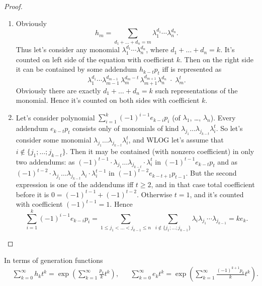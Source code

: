 \documentclass[12pt,a4paper]{article}
\begin{document}
    \begin{proof}
        \begin{enumerate}
            \item Obviously
                \[h_m = \sum_{d_1 + \dots + d_n = m} \lambda_1^{d_1} \cdots \lambda_n^{d_n}.\]
                Thus let's consider any monomial $\lambda_1^{d_1} \cdots \lambda_n^{d_n}$, where $d_1 + \dots + d_n = k$. It's counted on left side of the equation with coefficient $k$. Then on the right side it can be contained by some addendum $h_{k-t} p_t$ iff is represented as
                \[\lambda_1^{d_1} \cdots \lambda_{m-1}^{d_{m-1}}\, \lambda_m^{d_m - t}\, \lambda_{m+1}^{d_{m+1}} \lambda_n^{d_n} \; \cdot \; \lambda_m^t.\]
                Obviously there are exactly $d_1 + \dots + d_n = k$ such representations of the monomial. Hence it's counted on both sides with coefficient $k$.
                
            \item Let's consider polynomial $\sum_{i=1}^k (-1)^{i-1}e_{k-i} p_i$ (of $\lambda_1$, \dots, $\lambda_n$). Every addendum $e_{k-t} p_t$ consists only of monomials of kind $\lambda_{j_1} \dots \lambda_{j_{k-t}} \lambda_i^{t}$. So let's consider some monomial $\lambda_{j_1} \dots \lambda_{j_{k-t}} \lambda_i^{t}$, and WLOG let's assume that $i \notin \{j_1; \dots; j_{k-t}\}$. Then it may be contained (with nonzero coefficient) in only two addendums: as $(-1)^{t-1} \cdot \lambda_{j_1} \dots \lambda_{j_{k-t}} \cdot \lambda_i^{t}$ in $(-1)^{t-1} e_{k-t} p_t$ and as $(-1)^{t-2} \cdot \lambda_{j_1} \dots \lambda_{j_{k-t}} \lambda_i \cdot \lambda_i^{t-1}$ in $(-1)^{t-2} e_{k-t+1} p_{t-1}$. But the second expression is one of the addendums iff $t \geqslant 2$, and in that case total coefficient before it is $0 = (-1)^{t-1} + (-1)^{t-2}$. Otherwise $t = 1$, and it's counted with coefficient $(-1)^{t-1} = 1$. Hence
                \[
                    \sum_{i=1}^k (-1)^{i-1}e_{k-i} p_i
                    = \sum_{1 \leqslant j_1 < \dots < j_{k-1} \leqslant n} \; \sum_{i \notin \{j_1; \dots; j_{k-1}\}} \lambda_i \lambda_{j_1} \cdots \lambda_{j_{k-1}}
                    = k e_k.
                \]
        \end{enumerate}
    \end{proof}

    \begin{lemma}
        In terms of generation functions
        \begin{align*}
            &\sum_{k=0}^{\infty} h_k t^k = \exp\left(\sum_{k=1}^{\infty} \frac{p_k}{k} t^k\right),&
            &\sum_{k=0}^{\infty} e_k t^k = \exp\left(\sum_{k=1}^{\infty} \frac{(-1)^{k+1} p_k}{k} t^k\right).
        \end{align*}
    \end{lemma}
\end{document}
